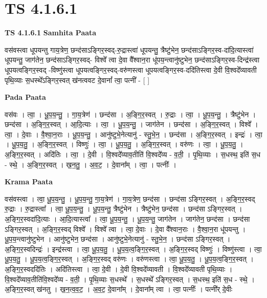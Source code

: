 \documentclass[17pt]{extarticle}
\begin{document}
\section{ TS 4.1.6.1 }

\textbf{TS 4.1.6.1 } \newline
\textbf{Samhita Paata} \newline

वस॑वस्त्वा धूपयन्तु गाय॒त्रेण॒ छन्द॑साऽङ्गिर॒स्वद्-रु॒द्रास्त्वा॑ धूपयन्तु॒ त्रैष्टु॑भेन॒ छन्द॑साऽङ्गिर॒स्व-दा॑दि॒त्यास्त्वा॑ धूपयन्तु॒ जाग॑तेन॒ छन्द॑साऽङ्गिर॒स्वद्- विश्वे᳚ त्वा दे॒वा वै᳚श्वान॒रा धू॑पय॒न्त्वानु॑ष्टुभेन॒ छन्द॑साऽङ्गिर॒स्व-दिन्द्र॑स्त्वा धूपयत्वङ्गिर॒स्वद् -विष्णु॑स्त्वा धूपयत्वङ्गिर॒स्वद्-वरु॑णस्त्वा धूपयत्वङ्गिर॒स्व-ददि॑तिस्त्वा दे॒वी वि॒श्वदे᳚व्यावती पृथि॒व्याः स॒धस्थे᳚ऽङ्गिर॒स्वत् ख॑नत्ववट दे॒वानां᳚ त्वा॒ पत्नी᳚ - [  ] \newline

\textbf{Pada Paata} \newline

वस॑वः । त्वा॒ । धू॒प॒य॒न्तु॒ । गा॒य॒त्रेण॑ । छन्द॑सा । अ॒ङ्गि॒र॒स्वत् । रु॒द्राः । त्वा॒ । धू॒प॒य॒न्तु॒ । त्रैष्टु॑भेन । छन्द॑सा । अ॒ङ्गि॒र॒स्वत् । आ॒दि॒त्याः । त्वा॒ । धू॒प॒य॒न्तु॒ । जाग॑तेन । छन्द॑सा । अ॒ङ्गि॒र॒स्वत् । विश्वे᳚ । त्वा॒ । दे॒वाः । वै॒श्वा॒न॒राः । धू॒प॒य॒न्तु॒ । आनु॑ष्टुभे॒नेत्यानु॑ - स्तु॒भे॒न॒ । छन्द॑सा । अ॒ङ्गि॒र॒स्वत् । इन्द्रः॑ । त्वा॒ । धू॒प॒य॒तु॒ । अ॒ङ्गि॒र॒स्वत् । विष्णुः॑ । त्वा॒ । धू॒प॒य॒तु॒ । अ॒ङ्गि॒र॒स्वत् । वरु॑णः । त्वा॒ । धू॒प॒य॒तु॒ । अ॒ङ्गि॒र॒स्वत् । अदि॑तिः । त्वा॒ । दे॒वी । वि॒श्वदे᳚व्याव॒तीति॑ वि॒श्वदे᳚व्य - व॒ती॒ । पृ॒थि॒व्याः । स॒धस्थ॒ इति॑ स॒ध - स्थे॒ । अ॒ङ्गि॒र॒स्वत् । ख॒न॒तु॒ । अ॒व॒ट॒ । दे॒वाना᳚म् । त्वा॒ । पत्नीः᳚ ।  \newline


\textbf{Krama Paata} \newline

वस॑वस्त्वा । त्वा॒ धू॒प॒य॒न्तु॒ । धू॒प॒य॒न्तु॒ गा॒य॒त्रेण॑ । गा॒य॒त्रेण॒ छन्द॑सा । छन्द॑सा ऽङ्गिर॒स्वत् । अ॒ङ्गि॒र॒स्वद् रु॒द्राः । रु॒द्रास्त्वा᳚ । त्वा॒ धू॒प॒य॒न्तु॒ । धू॒प॒य॒न्तु॒ त्रैष्टु॑भेन । त्रैष्टु॑भेन॒ छन्द॑सा । छन्द॑सा ऽङ्गिर॒स्वत् । अ॒ङ्गि॒र॒स्वदा॑दि॒त्याः । आ॒दि॒त्यास्त्वा᳚ । त्वा॒ धू॒प॒य॒न्तु॒ । धू॒प॒य॒न्तु॒ जाग॑तेन । जाग॑तेन॒ छन्द॑सा । छन्द॑सा ऽङ्गिर॒स्वत् । अ॒ङ्गि॒र॒स्वद् विश्वे᳚ । विश्वे᳚ त्वा । त्वा॒ दे॒वाः । दे॒वा वै᳚श्वान॒राः । वै॒श्वा॒न॒रा धू॑पयन्तु । धू॒प॒य॒न्त्वानु॑ष्टुभेन । आनु॑ष्टुभेन॒ छन्द॑सा । आनु॑ष्टुभे॒नेत्यानु॑ - स्तु॒भे॒न॒ । छन्द॑सा ऽङ्गिर॒स्वत् । अ॒ङ्गि॒र॒स्वदिन्द्रः॑ । इन्द्र॑स्त्वा । त्वा॒ धू॒प॒य॒तु॒ । धू॒प॒य॒त्व॒ङ्गि॒र॒स्वत् । अ॒ङ्गि॒र॒स्वद् विष्णुः॑ । विष्णु॑स्त्वा । त्वा॒ धू॒प॒य॒तु॒ । धू॒प॒य॒त्व॒ङ्गि॒र॒स्वत् । अ॒ङ्गि॒र॒स्वद् वरु॑णः । वरु॑णस्त्वा । त्वा॒ धू॒प॒य॒तु॒ । धू॒प॒य॒त्व॒ङ्गि॒र॒स्वत् । अ॒ङ्गि॒र॒स्वददि॑तिः । अदि॑तिस्त्वा । त्वा॒ दे॒वी । दे॒वी वि॒श्वदे᳚व्यावती । वि॒श्वदे᳚व्यावती पृथि॒व्याः । वि॒श्वदे᳚व्याव॒तीति॑वि॒श्वदे᳚व्य - व॒ती॒ । पृ॒थि॒व्याः स॒धस्थे᳚ । स॒धस्थे᳚ ऽङ्गिर॒स्वत् । स॒धस्थ॒ इति॑ स॒ध - स्थे॒ । अ॒ङ्गि॒र॒स्वत् ख॑नतु । ख॒न॒त्व॒व॒ट॒ । अ॒व॒ट॒ दे॒वाना᳚म् । दे॒वाना᳚म् त्वा । त्वा॒ पत्नीः᳚ । पत्नी᳚र् दे॒वीः \newline
\end{document}
